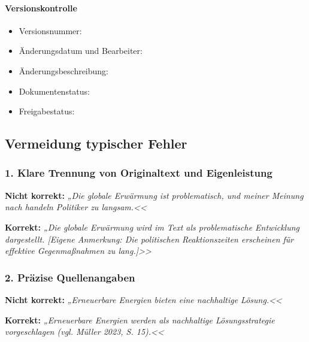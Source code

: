 \documentclass{vorlage-design-main}
\begin{document}
\paragraph{Versionskontrolle}\label{versionskontrolle}

\begin{itemize}

\item
  Versionsnummer:
\item
  Änderungsdatum und Bearbeiter:
\item
  Änderungsbeschreibung:
\item
  Dokumentenstatus:
\item
  Freigabestatus:
\end{itemize}

\subsection{Vermeidung typischer
Fehler}\label{vermeidung-typischer-fehler}

\subsubsection{1. Klare Trennung von Originaltext und
Eigenleistung}\label{klare-trennung-von-originaltext-und-eigenleistung}

\textbf{Nicht korrekt:} \emph{„Die globale Erwärmung ist problematisch,
und meiner Meinung nach handeln Politiker zu langsam.<<}

\textbf{Korrekt:} \emph{„Die globale Erwärmung wird im Text als
problematische Entwicklung dargestellt. {[}Eigene Anmerkung: Die
politischen Reaktionszeiten erscheinen für effektive Gegenmaßnahmen zu
lang.{]}>>}

\subsubsection{2. Präzise
Quellenangaben}\label{praezise-quellenangaben}

\textbf{Nicht korrekt:} \emph{„Erneuerbare Energien bieten eine
nachhaltige Lösung.<<}

\textbf{Korrekt:} \emph{„Erneuerbare Energien werden als nachhaltige
Lösungsstrategie vorgeschlagen (vgl. Müller 2023, S. 15).<<}


\clearpage
\printbibliography
\end{document}
